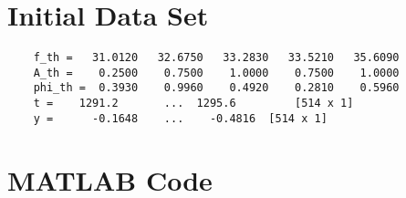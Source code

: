 \section{Initial Data Set}
\label{Appendix A}
\begin{verbatim}
	f_th =   31.0120   32.6750   33.2830   33.5210   35.6090
	A_th =    0.2500    0.7500    1.0000    0.7500    1.0000
	phi_th =  0.3930    0.9960    0.4920    0.2810    0.5960
	t =    1291.2 	    ...	 1295.6 		[514 x 1]
	y =      -0.1648    ...	   -0.4816	[514 x 1]
\end{verbatim}


\section{MATLAB Code}
\label{Appendix B}
